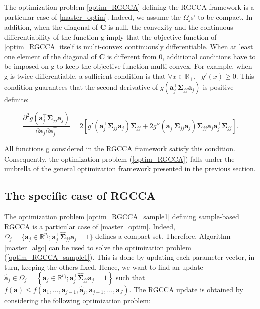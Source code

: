 \documentclass[
]{jss}
\begin{document}
The optimization problem \eqref{optim_RGCCA} defining the RGCCA
framework is a particular case of \eqref{master_optim}. Indeed, we
assume the \(\Omega_j\)s' to be compact. In addition, when the diagonal
of \(\mathbf{C}\) is null, the convexity and the continuous
differentiability of the function g imply that the objective function of
\eqref{optim_RGCCA} itself is multi-convex continuously differentiable.
When at least one element of the diagonal of \(\mathbf{C}\) is different
from \(0\), additional conditions have to be imposed on g to keep the
objective function multi-convex. For example, when g is twice
differentiable, a sufficient condition is that
\(\forall x\in\mathbb{R}_+, \text{ } g'(x)\geq 0\). This condition
guarantees that the second derivative of
\(g\left(\mathbf{a}_j^\top \mathbf{\Sigma}_{jj} \mathbf{a}_j\right)\) is
positive-definite:

\begin{equation}
\frac{\partial^2 g\left(\mathbf a_j^\top  \mathbf \Sigma_{jj} \mathbf a_j \right)}{\partial \mathbf a_j \partial \mathbf a_j^\top} = 2 \left[ g'\left( \mathbf a_j^\top  \mathbf \Sigma_{jj} \mathbf a_j \right) \mathbf \Sigma_{jj} + 2 g''\left(\mathbf a_j^\top  \mathbf \Sigma_{jj} \mathbf a_j\right)  \mathbf \Sigma_{jj}\mathbf a_j\mathbf a_j^\top \mathbf \Sigma_{jj} \right]. 
\end{equation}

All functions g considered in the RGCCA framework satisfy this
condition. Consequently, the optimization problem (\ref{optim_RGCCA})
falls under the umbrella of the general optimization framework presented
in the previous section.

\subsection{The specific case of
RGCCA}\label{the-specific-case-of-rgcca}

The optimization problem \eqref{optim_RGCCA_sample1} defining
sample-based RGCCA is a particular case of \eqref{master_optim}. Indeed,
\(\Omega_j = \{ \mathbf a_j \in \mathbb{R}^{p_j}; \mathbf a_j^\top \widehat{\mathbf{\Sigma}}_{jj} \mathbf a_j = 1\}\)
defines a compact set. Therefore, Algorithm \ref{master_algo} can be
used to solve the optimization problem (\ref{optim_RGCCA_sample1}). This
is done by updating each parameter vector, in turn, keeping the others
fixed. Hence, we want to find an update
\(\hat{\mathbf{a}}_j\in \Omega_j=\left\lbrace \mathbf a_j \in \mathbb{R}^{p_j}; \mathbf{a}_j^\top \widehat{\mathbf{\Sigma}}_{jj} \mathbf{a}_j = 1 \right\rbrace\)
such that
\(f(\mathbf{a})\leq f(\mathbf{a}_1, \ldots, \mathbf{a}_{j-1}, \hat{\mathbf{a}}_j, \mathbf{a}_{j+1}, \ldots, \mathbf{a}_J)\).
The RGCCA update is obtained by considering the following optimization
problem:
\end{document}
